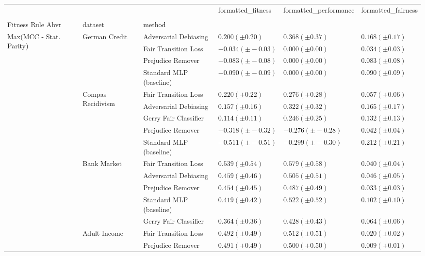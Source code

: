 \begin{tabular}{llllll}
\toprule
 &  &  & formatted_fitness & formatted_performance & formatted_fairness \\
 &  &  &  &  &  \\
Fitness Rule Abvr & dataset & method &  &  &  \\
\midrule
\multirow[t]{19}{*}{Max(MCC - Stat. Parity)} & \multirow[t]{4}{*}{German Credit} & Adversarial Debiasing & $0.200 (\pm0.20)$ & $0.368 (\pm0.37)$ & $0.168 (\pm0.17)$ \\
 &  & Fair Transition Loss & $-0.034 (\pm-0.03)$ & $0.000 (\pm0.00)$ & $0.034 (\pm0.03)$ \\
 &  & Prejudice Remover & $-0.083 (\pm-0.08)$ & $0.000 (\pm0.00)$ & $0.083 (\pm0.08)$ \\
 &  & Standard MLP (baseline) & $-0.090 (\pm-0.09)$ & $0.000 (\pm0.00)$ & $0.090 (\pm0.09)$ \\
\cline{2-6}
 & \multirow[t]{5}{*}{Compas Recidivism} & Fair Transition Loss & $0.220 (\pm0.22)$ & $0.276 (\pm0.28)$ & $0.057 (\pm0.06)$ \\
 &  & Adversarial Debiasing & $0.157 (\pm0.16)$ & $0.322 (\pm0.32)$ & $0.165 (\pm0.17)$ \\
 &  & Gerry Fair Classifier & $0.114 (\pm0.11)$ & $0.246 (\pm0.25)$ & $0.132 (\pm0.13)$ \\
 &  & Prejudice Remover & $-0.318 (\pm-0.32)$ & $-0.276 (\pm-0.28)$ & $0.042 (\pm0.04)$ \\
 &  & Standard MLP (baseline) & $-0.511 (\pm-0.51)$ & $-0.299 (\pm-0.30)$ & $0.212 (\pm0.21)$ \\
\cline{2-6}
 & \multirow[t]{5}{*}{Bank Market} & Fair Transition Loss & $0.539 (\pm0.54)$ & $0.579 (\pm0.58)$ & $0.040 (\pm0.04)$ \\
 &  & Adversarial Debiasing & $0.459 (\pm0.46)$ & $0.505 (\pm0.51)$ & $0.046 (\pm0.05)$ \\
 &  & Prejudice Remover & $0.454 (\pm0.45)$ & $0.487 (\pm0.49)$ & $0.033 (\pm0.03)$ \\
 &  & Standard MLP (baseline) & $0.419 (\pm0.42)$ & $0.522 (\pm0.52)$ & $0.102 (\pm0.10)$ \\
 &  & Gerry Fair Classifier & $0.364 (\pm0.36)$ & $0.428 (\pm0.43)$ & $0.064 (\pm0.06)$ \\
\cline{2-6}
 & \multirow[t]{5}{*}{Adult Income} & Fair Transition Loss & $0.492 (\pm0.49)$ & $0.512 (\pm0.51)$ & $0.020 (\pm0.02)$ \\
 &  & Prejudice Remover & $0.491 (\pm0.49)$ & $0.500 (\pm0.50)$ & $0.009 (\pm0.01)$ \\

\end{tabular}
